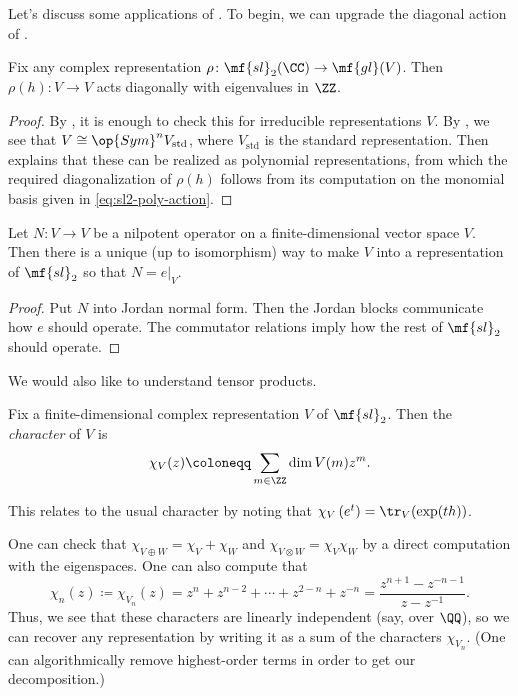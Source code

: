 \documentclass[../notes.tex]{subfiles}
\begin{document}
Let's discuss some applications of . To begin, we can upgrade the diagonal action of .
\begin{corollary}
	Fix any complex representation $\rho\colon\mf{sl}_2(\CC)\to\mf{gl}(V)$. Then $\rho(h)\colon V\to V$ acts diagonally with eigenvalues in $\ZZ$.
\end{corollary}
\begin{proof}
	By , it is enough to check this for irreducible representations $V$. By , we see that $V\cong\op{Sym}^nV_{\mathrm{std}}$, where $V_{\mathrm{std}}$ is the standard representation. Then  explains that these can be realized as polynomial representations, from which the required diagonalization of $\rho(h)$ follows from its computation on the monomial basis given in \eqref{eq:sl2-poly-action}.
\end{proof}
\begin{corollary}
	Let $N\colon V\to V$ be a nilpotent operator on a finite-dimensional vector space $V$. Then there is a unique (up to isomorphism) way to make $V$ into a representation of $\mf{sl}_2$ so that $N=e|_V$.
\end{corollary}
\begin{proof}
	Put $N$ into Jordan normal form. Then the Jordan blocks communicate how $e$ should operate. The commutator relations imply how the rest of $\mf{sl}_2$ should operate.
\end{proof}
We would also like to understand tensor products.
\begin{definition}
	Fix a finite-dimensional complex representation $V$ of $\mf{sl}_2$. Then the \textit{character} of $V$ is
	\[\chi_V(z)\coloneqq\sum_{m\in\ZZ}\dim V(m)z^m.\]
\end{definition}
\begin{remark}
	This relates to the usual character by noting that $\chi_V\left(e^t\right)=\tr_V(\exp(th))$.
\end{remark}
One can check that $\chi_{V\oplus W}=\chi_V+\chi_W$ and $\chi_{V\otimes W}=\chi_V\chi_W$ by a direct computation with the eigenspaces. One can also compute that
\[\chi_n(z)\coloneqq\chi_{V_n}(z)=z^n+z^{n-2}+\cdots+z^{2-n}+z^{-n}=\frac{z^{n+1}-z^{-n-1}}{z-z^{-1}}.\]
Thus, we see that these characters are linearly independent (say, over $\QQ$), so we can recover any representation by writing it as a sum of the characters $\chi_{V_n}$. (One can algorithmically remove highest-order terms in order to get our decomposition.)
\end{document}
